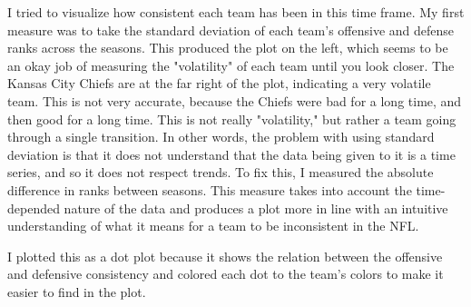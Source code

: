 \documentclass{article}
\begin{document}
I tried to visualize how consistent each team has been in this time frame.
My first measure was to take the standard deviation of each team's offensive and defense ranks
across the seasons. This produced the plot on the left, which seems to be an okay job of measuring
the "volatility" of each team until you look closer. The Kansas City Chiefs are at the far right of the 
plot, indicating a very volatile team. This is not very accurate, because the Chiefs were bad for a long time,
and then good for a long time. This is not really "volatility," but rather a team going through a single transition.
In other words, the problem with using standard deviation is that it does not understand that the data being given to
it is a time series, and so it does not respect trends. To fix this, I measured the absolute difference in ranks between seasons.
This measure takes into account the time-depended nature of the data and produces
a plot more in line with an intuitive understanding of what it means for a team to be inconsistent in the NFL.

I plotted this as a dot plot because it shows the relation between the offensive and defensive consistency
and colored each dot to the team's colors to make it easier to find in the plot.
\end{document}
